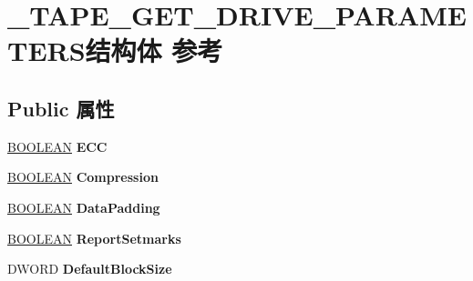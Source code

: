 \hypertarget{struct___t_a_p_e___g_e_t___d_r_i_v_e___p_a_r_a_m_e_t_e_r_s}{}\section{\+\_\+\+T\+A\+P\+E\+\_\+\+G\+E\+T\+\_\+\+D\+R\+I\+V\+E\+\_\+\+P\+A\+R\+A\+M\+E\+T\+E\+R\+S结构体 参考}
\label{struct___t_a_p_e___g_e_t___d_r_i_v_e___p_a_r_a_m_e_t_e_r_s}
\subsection*{Public 属性}
\begin{DoxyCompactItemize}
\item 
\mbox{\label{struct___t_a_p_e___g_e_t___d_r_i_v_e___p_a_r_a_m_e_t_e_r_s_afcb7c14126c65d7e3c992f04e51322da}} 
\hyperlink{_processor_bind_8h_a112e3146cb38b6ee95e64d85842e380a}{B\+O\+O\+L\+E\+AN} {\bfseries E\+CC}
\item 
\mbox{\label{struct___t_a_p_e___g_e_t___d_r_i_v_e___p_a_r_a_m_e_t_e_r_s_a5f914978ddd46f7ba7142613e8b559cf}} 
\hyperlink{_processor_bind_8h_a112e3146cb38b6ee95e64d85842e380a}{B\+O\+O\+L\+E\+AN} {\bfseries Compression}
\item 
\mbox{\label{struct___t_a_p_e___g_e_t___d_r_i_v_e___p_a_r_a_m_e_t_e_r_s_ab61a42b178f7246aa929ad90669e9c27}} 
\hyperlink{_processor_bind_8h_a112e3146cb38b6ee95e64d85842e380a}{B\+O\+O\+L\+E\+AN} {\bfseries Data\+Padding}
\item 
\mbox{\label{struct___t_a_p_e___g_e_t___d_r_i_v_e___p_a_r_a_m_e_t_e_r_s_a4b09420cdeccfcb778ac45d4c5365ab3}} 
\hyperlink{_processor_bind_8h_a112e3146cb38b6ee95e64d85842e380a}{B\+O\+O\+L\+E\+AN} {\bfseries Report\+Setmarks}
\item 
\mbox{\label{struct___t_a_p_e___g_e_t___d_r_i_v_e___p_a_r_a_m_e_t_e_r_s_af4554a42ce33d7f2fd7905add0c74904}} 
D\+W\+O\+RD {\bfseries Default\+Block\+Size}

\end{DoxyCompactItemize}
